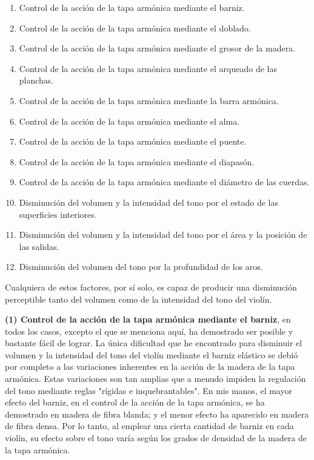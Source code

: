 \documentclass[12pt]{book}
\begin{document}
\begin{enumerate}
    \item Control de la acción de la tapa armónica mediante el barniz.
    \item Control de la acción de la tapa armónica mediante el doblado.
    \item Control de la acción de la tapa armónica mediante el grosor de la madera.
    \item Control de la acción de la tapa armónica mediante el arqueado de las planchas.
    \item Control de la acción de la tapa armónica mediante la barra armónica.
    \item Control de la acción de la tapa armónica mediante el alma.
    \item Control de la acción de la tapa armónica mediante el puente.
    \item Control de la acción de la tapa armónica mediante el diapasón.
    \item Control de la acción de la tapa armónica mediante el diámetro de las cuerdas.
    \item Disminución del volumen y la intensidad del tono por el estado de las superficies interiores.
    \item Disminución del volumen y la intensidad del tono por el área y la posición de las salidas.
    \item Disminución del volumen del tono por la profundidad de los aros.
\end{enumerate}

Cualquiera de estos factores, por sí solo, es capaz de producir una disminución perceptible tanto del volumen como de la intensidad del tono del violín.

\textbf{(1) Control de la acción de la tapa armónica mediante el barniz}, en todos los casos, excepto el que se menciona aquí, ha demostrado ser posible y bastante fácil de lograr. La única dificultad que he encontrado para disminuir el volumen y la intensidad del tono del violín mediante el barniz elástico se debió por completo a las variaciones inherentes en la acción de la madera de la tapa armónica. Estas variaciones son tan amplias que a menudo impiden la regulación del tono mediante reglas "rígidas e inquebrantables". En mis manos, el mayor efecto del barniz, en el control de la acción de la tapa armónica, se ha demostrado en madera de fibra blanda; y el menor efecto ha aparecido en madera de fibra densa. Por lo tanto, al emplear una cierta cantidad de barniz en cada violín, su efecto sobre el tono varía según los grados de densidad de la madera de la tapa armónica.
\end{document}
